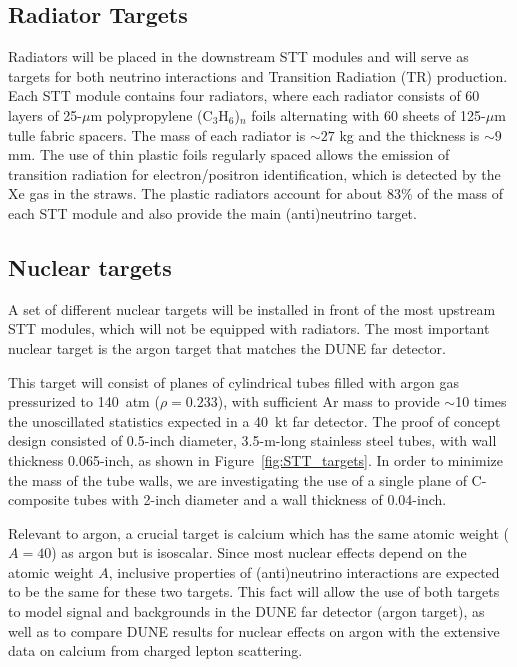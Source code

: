 \subsection{Radiator Targets}

Radiators will be placed in the downstream STT modules
and will serve as targets for both neutrino interactions 
and Transition Radiation (TR) production. Each STT module contains 
four radiators, where each radiator consists of
60 layers of 25-$\mu$m polypropylene (C$_3$H$_6$)$_n$ 
foils alternating with 60 sheets of 125-$\mu$m tulle fabric spacers. 
The mass of each radiator is $\sim27$ kg and the thickness is 
$\sim9$ mm. 
The use of thin plastic foils
regularly spaced allows the emission of transition radiation for
electron/positron identification, which is detected by the Xe gas in
the straws. The plastic radiators account for about 83\% of the mass of each STT module and
also provide the main (anti)neutrino target.

\subsection{Nuclear targets}

A set of different nuclear targets will be installed in front of the
most upstream STT modules, which will not be equipped with radiators.
The most important nuclear target is the argon target that matches
the DUNE far detector.

This target will consist of planes of cylindrical tubes filled with
argon gas pressurized to 140~atm ($\rho = 0.233$), with
sufficient Ar mass to provide $\sim$10 times the unoscillated
statistics expected in a 40~kt far detector. The proof of concept design
consisted of 0.5-inch diameter, 3.5-m-long stainless steel tubes,
with wall thickness 0.065-inch, as shown in Figure~\ref{fig:STT_targets}. 
In order to minimize the mass of the
tube walls, we are investigating the use of a single plane of C-composite
tubes with 2-inch diameter and a wall thickness of 0.04-inch.

Relevant to argon, a crucial target is calcium which has the same
atomic weight ($A=40$) as argon but is isoscalar.  Since most nuclear
effects depend on the atomic weight $A$, inclusive properties of
(anti)neutrino interactions are expected to be the same for these two
targets.  This fact will allow the use of both targets to model
signal and backgrounds in the DUNE far detector (argon target), as
well as to compare DUNE results for nuclear effects on argon with the
extensive data on calcium from charged lepton scattering.

